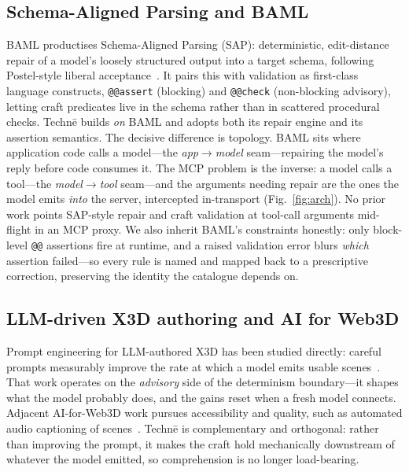 \documentclass[sigconf,nonacm,screen,anonymous]{acmart}
\begin{document}
\subsection{Schema-Aligned Parsing and BAML}
BAML productises Schema-Aligned Parsing (SAP): deterministic, edit-distance repair of a model's loosely structured output into a target schema, following Postel-style liberal acceptance~\cite{baml,postel}. It pairs this with validation as first-class language constructs, \texttt{@@assert} (blocking) and \texttt{@@check} (non-blocking advisory), letting craft predicates live in the schema rather than in scattered procedural checks. Technē builds \emph{on} BAML and adopts both its repair engine and its assertion semantics. The decisive difference is topology. BAML sits where application code calls a model---the \emph{app$\rightarrow$model} seam---repairing the model's reply before code consumes it. The MCP problem is the inverse: a model calls a tool---the \emph{model$\rightarrow$tool} seam---and the arguments needing repair are the ones the model emits \emph{into} the server, intercepted in-transport (Fig.~\ref{fig:arch}). No prior work points SAP-style repair and craft validation at tool-call arguments mid-flight in an MCP proxy. We also inherit BAML's constraints honestly: only block-level \texttt{@@} assertions fire at runtime, and a raised validation error blurs \emph{which} assertion failed---so every rule is named and mapped back to a prescriptive correction, preserving the identity the catalogue depends on.

\subsection{LLM-driven X3D authoring and AI for Web3D}
Prompt engineering for LLM-authored X3D has been studied directly: careful prompts measurably improve the rate at which a model emits usable scenes~\cite{prompteng}. That work operates on the \emph{advisory} side of the determinism boundary---it shapes what the model probably does, and the gains reset when a fresh model connects. Adjacent AI-for-Web3D work pursues accessibility and quality, such as automated audio captioning of scenes~\cite{audiocaption}. Technē is complementary and orthogonal: rather than improving the prompt, it makes the craft hold mechanically downstream of whatever the model emitted, so comprehension is no longer load-bearing.
\end{document}
